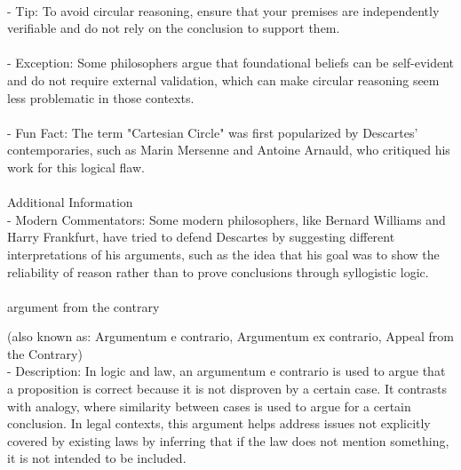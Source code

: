 \documentclass[a4paper,12pt,single,pdftex]{scrbook}
\begin{document}
    
      
    \\

    
      - Tip: To avoid circular reasoning, ensure that your premises are independently verifiable and do not rely on the conclusion to support them.
    \\

    
      
    \\

    
      - Exception: Some philosophers argue that foundational beliefs can be self-evident and do not require external validation, which can make circular reasoning seem less problematic in those contexts.
    \\

    
      
    \\

    
      - Fun Fact: The term "Cartesian Circle" was first popularized by Descartes' contemporaries, such as Marin Mersenne and Antoine Arnauld, who critiqued his work for this logical flaw.
    \\

    
      
    \\

    
      Additional Information
    \\

    
      - Modern Commentators: Some modern philosophers, like Bernard Williams and Harry Frankfurt, have tried to defend Descartes by suggesting different interpretations of his arguments, such as the idea that his goal was to show the reliability of reason rather than to prove conclusions through syllogistic logic.
    \\

    
      
    \\

  

argument from the contrary
    
      (also known as: Argumentum e contrario, Argumentum ex contrario, Appeal from the Contrary)
    \\

  
    
      - Description: In logic and law, an argumentum e contrario is used to argue that a proposition is correct because it is not disproven by a certain case. It contrasts with analogy, where similarity between cases is used to argue for a certain conclusion. In legal contexts, this argument helps address issues not explicitly covered by existing laws by inferring that if the law does not mention something, it is not intended to be included.
    \\
\end{document}
